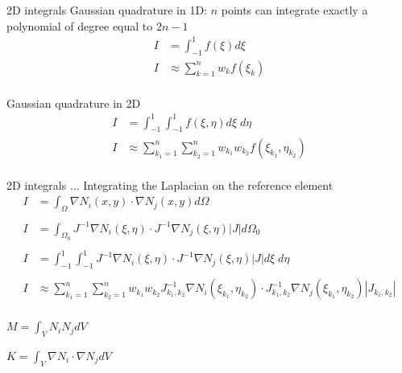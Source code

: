 \documentclass[handout]{beamer}
{
\usepackage{fullpage}
\usepackage{hyperref}
\usepackage{amssymb} 
}
\begin{document}
\begin{frame}{2D integrals}
Gaussian quadrature in 1D: $n$ points can integrate exactly a polynomial
of degree equal to $2 n - 1$
\begin{align*}
I &= \int_{-1}^1 f(\xi) d \xi  \\
I &\approx \sum_{k=1}^n w_k f(\xi_k) \\
\end{align*}


Gaussian quadrature in 2D
\begin{align*}
I &= \int_{-1}^1 \int_{-1}^1 f(\xi, \eta) d \xi \; d \eta \\
I &\approx \sum_{k_1=1}^n \sum_{k_2=1}^n w_{k_1} w_{k_2} f(\xi_{k_1}, \eta_{k_2}) \\
\end{align*}

\end{frame}

\begin{frame}{2D integrals $\ldots$}
Integrating the Laplacian on the reference element
\begin{align*}
I &= \int_{\Omega} \nabla N_i(x,y) \cdot \nabla N_j(x,y) d \Omega \\ \\
I &= \int_{\Omega_0} J^{-1} \nabla N_i (\xi, \eta) \cdot J^{-1}\nabla N_j (\xi, \eta) |J| d \Omega_0 \\ \\
I &= \int_{-1}^1 \int_{-1}^1 J^{-1} \nabla N_i(\xi, \eta) \cdot J^{-1}\nabla N_j(\xi, \eta) |J| d \xi \; d \eta \\ \\
I &\approx \sum_{k_1=1}^n \sum_{k_2=1}^n w_{k_1} w_{k_2} J^{-1}_{k_1,k_2} \nabla N_i(\xi_{k_1}, \eta_{k_2}) \cdot J^{-1}_{k_1,k_2} \nabla N_j(\xi_{k_1}, \eta_{k_2}) |J_{k_1,k_2}|\\
\end{align*}

\end{frame}

\begin{frame}{}
\begin{center}
$\displaystyle M = \int_V N_i N_j d V$

\end{center}
\end{frame}


\begin{frame}{}
\begin{center}
$\displaystyle K = \int_V \nabla N_i \cdot \nabla N_j d V$

\end{center}
\end{frame}

%
\end{document}
